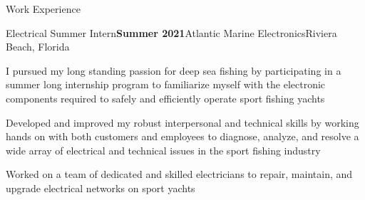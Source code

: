 \documentclass{resume} %
\begin{document}
\begin{rSection}{Work Experience}



	\begin{rSubsection}{Electrical Summer Intern}{\bf  Summer 2021}{Atlantic Marine Electronics}{Riviera Beach, Florida}\smallskip
	
		
		\item I pursued my long standing passion for deep sea fishing by participating in a summer long internship program to familiarize myself with the electronic components required to safely and efficiently operate sport fishing yachts
		
		\item Developed and improved my robust interpersonal and technical skills by working hands on with both customers and employees to diagnose, analyze, and resolve a wide array of electrical and technical issues in the sport fishing industry
	
		\item Worked on a team of dedicated and skilled electricians to repair, maintain, and upgrade electrical networks on sport yachts
	
	\end{rSubsection}

		
	
	
	
\end{rSection}
\end{document}
